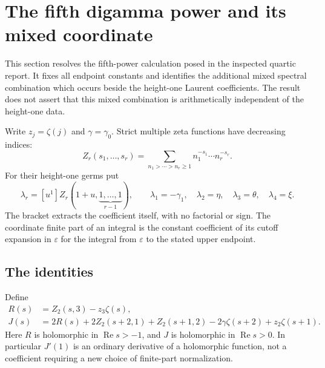 \documentclass[11pt,a4paper]{article}
\numberwithin{equation}{section}
\theoremstyle{definition}
\begin{document}

\section{The fifth digamma power and its mixed coordinate}
\label{q5:section}

This section resolves the fifth-power calculation posed in the inspected
quartic report.  It fixes all endpoint constants and identifies the
additional mixed spectral combination which occurs beside the
height-one Laurent coefficients.  The result does not assert that this
mixed combination is arithmetically independent of the height-one data.

Write $z_j=\zeta(j)$ and $\gamma=\gamma_0$.  Strict multiple zeta
functions have decreasing indices:
\[
 Z_r(s_1,\ldots,s_r)
   =\sum_{n_1>\cdots>n_r\geq1}
        n_1^{-s_1}\cdots n_r^{-s_r}.
\]
For their height-one germs put
\begin{equation}\label{q5:lambda}
 \lambda_r=[u^1]Z_r(1+u,\underbrace{1,\ldots,1}_{r-1}),
 \qquad
 \lambda_1=-\gamma_1,\quad
 \lambda_2=\eta,\quad\lambda_3=\theta,\quad\lambda_4=\xi.
\end{equation}
The bracket extracts the coefficient itself, with no factorial or sign.
The coordinate finite part of an integral is the constant coefficient
of its cutoff expansion in $\varepsilon$ for the integral from
$\varepsilon$ to the stated upper endpoint.

\subsection{The identities}

Define
\begin{align}
 R(s)&=Z_2(s,3)-z_3\zeta(s),\label{q5:R}\\
 J(s)&=2R(s)+2Z_2(s+2,1)+Z_2(s+1,2)
                 -2\gamma\zeta(s+2)+z_2\zeta(s+1).
 \label{q5:J}
\end{align}
Here $R$ is holomorphic in $\operatorname{Re}s>-1$, and $J$ is
holomorphic in $\operatorname{Re}s>0$.  In particular $J'(1)$ is an
ordinary derivative of a holomorphic function, not a coefficient
requiring a new choice of finite-part normalization.
\end{document}
